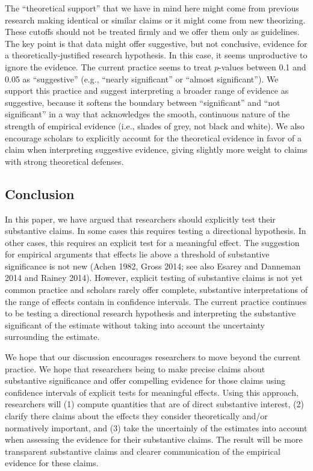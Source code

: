 \documentclass[12pt]{article}
\begin{document}
The ``theoretical support'' that we have in mind here might come from previous research making identical or similar claims or it might come from new theorizing.  These cutoffs should not be treated firmly and we offer them only as guidelines. The key point is that data might offer suggestive, but not conclusive, evidence for a theoretically-justified research hypothesis. In this case, it seems unproductive to ignore the evidence. The current practice seems to treat $p$-values between 0.1 and 0.05 as ``suggestive'' (e.g., ``nearly significant'' or ``almost significant''). We support this practice and suggest interpreting a broader range of evidence as suggestive, because it softens the boundary between ``significant'' and ``not significant'' in a way that acknowledges the smooth, continuous nature of the strength of empirical evidence (i.e., shades of grey, not black and white). We also encourage scholars to explicitly account for the theoretical evidence in favor of a claim when interpreting suggestive evidence, giving slightly more weight to claims with strong theoretical defenses. 

\subsection*{Conclusion}

In this paper, we have argued that researchers should explicitly test their substantive claims. In some cases this requires testing a directional hypothesis. In other cases, this requires an explicit test for a meaningful effect. The suggestion for empirical arguments that effects lie above a threshold of substantive significance is not new (Achen 1982, Gross 2014; see also Esarey and Danneman 2014 and Rainey 2014). However, explicit testing of substantive claims is not yet common practice and scholars rarely offer complete, substantive interpretations of the range of effects contain in confidence intervals. The current practice continues to be testing a directional research hypothesis and interpreting the substantive significant of the estimate without taking into account the uncertainty surrounding the estimate. 

We hope that our discussion encourages researchers to move beyond the current practice. We hope that researchers being to make precise claims about substantive significance and offer compelling evidence for those claims using confidence intervals of explicit tests for meaningful effects. Using this approach, researchers will (1) compute quantities that are of direct substantive interest, (2) clarify there claims about the effects they consider theoretically and/or normatively important, and (3) take the uncertainly of the estimates into account when assessing the evidence for their substantive claims. The result will be more transparent substantive claims and clearer communication of the empirical evidence for these claims.

%
%
\end{document}
